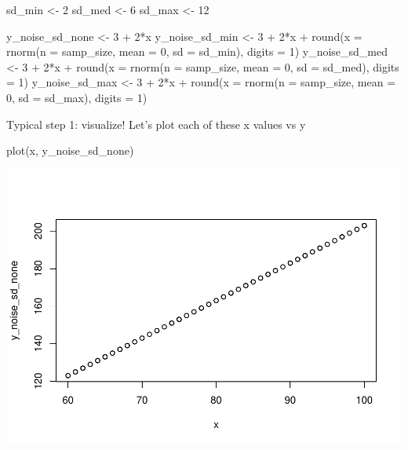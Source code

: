 \documentclass[
]{book}
\newenvironment{Shaded}{\begin{snugshade}}{\end{snugshade}}
\newcommand{\AttributeTok}[1]{\textcolor[rgb]{0.77,0.63,0.00}{#1}}
\newcommand{\DecValTok}[1]{\textcolor[rgb]{0.00,0.00,0.81}{#1}}
\newcommand{\FunctionTok}[1]{\textcolor[rgb]{0.00,0.00,0.00}{#1}}
\newcommand{\NormalTok}[1]{#1}
\newcommand{\OtherTok}[1]{\textcolor[rgb]{0.56,0.35,0.01}{#1}}
\newcommand{\SpecialCharTok}[1]{\textcolor[rgb]{0.00,0.00,0.00}{#1}}
\begin{document}
\begin{Shaded}
\begin{Highlighting}[]
\NormalTok{sd\_min }\OtherTok{\textless{}{-}} \DecValTok{2}
\NormalTok{sd\_med }\OtherTok{\textless{}{-}} \DecValTok{6}
\NormalTok{sd\_max }\OtherTok{\textless{}{-}} \DecValTok{12}

\NormalTok{y\_noise\_sd\_none }\OtherTok{\textless{}{-}} \DecValTok{3} \SpecialCharTok{+} \DecValTok{2}\SpecialCharTok{*}\NormalTok{x}
\NormalTok{y\_noise\_sd\_min }\OtherTok{\textless{}{-}} \DecValTok{3} \SpecialCharTok{+} \DecValTok{2}\SpecialCharTok{*}\NormalTok{x }\SpecialCharTok{+} \FunctionTok{round}\NormalTok{(}\AttributeTok{x =} \FunctionTok{rnorm}\NormalTok{(}\AttributeTok{n =}\NormalTok{ samp\_size, }\AttributeTok{mean =} \DecValTok{0}\NormalTok{, }\AttributeTok{sd =}\NormalTok{ sd\_min), }\AttributeTok{digits =} \DecValTok{1}\NormalTok{)}
\NormalTok{y\_noise\_sd\_med }\OtherTok{\textless{}{-}} \DecValTok{3} \SpecialCharTok{+} \DecValTok{2}\SpecialCharTok{*}\NormalTok{x }\SpecialCharTok{+} \FunctionTok{round}\NormalTok{(}\AttributeTok{x =} \FunctionTok{rnorm}\NormalTok{(}\AttributeTok{n =}\NormalTok{ samp\_size, }\AttributeTok{mean =} \DecValTok{0}\NormalTok{, }\AttributeTok{sd =}\NormalTok{ sd\_med), }\AttributeTok{digits =} \DecValTok{1}\NormalTok{)}
\NormalTok{y\_noise\_sd\_max }\OtherTok{\textless{}{-}} \DecValTok{3} \SpecialCharTok{+} \DecValTok{2}\SpecialCharTok{*}\NormalTok{x }\SpecialCharTok{+} \FunctionTok{round}\NormalTok{(}\AttributeTok{x =} \FunctionTok{rnorm}\NormalTok{(}\AttributeTok{n =}\NormalTok{ samp\_size, }\AttributeTok{mean =} \DecValTok{0}\NormalTok{, }\AttributeTok{sd =}\NormalTok{ sd\_max), }\AttributeTok{digits =} \DecValTok{1}\NormalTok{)}
\end{Highlighting}
\end{Shaded}

Typical step 1: visualize! Let's plot each of these x values vs y

\begin{Shaded}
\begin{Highlighting}[]
\FunctionTok{plot}\NormalTok{(x, y\_noise\_sd\_none)}
\end{Highlighting}
\end{Shaded}

\includegraphics{test_course_notes_files/figure-latex/remedy030-1.pdf}
\end{document}
